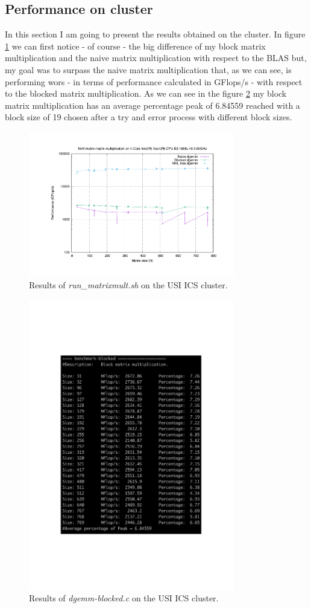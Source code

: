 \documentclass[unicode,11pt,a4paper,oneside,numbers=endperiod,openany]{scrartcl}
\begin{document}
\subsection{Performance on cluster}
In this section I am going to present the results obtained on the cluster. In figure \ref{fig:clustyPerfGraph} we can first notice - of course - the big difference of my block matrix multiplication and the naive matrix multiplication with respect to the BLAS but, my goal was to surpass the naive matrix multiplication that, as we can see, is performing wors - in terms of performance calculated in GFlops/s - with respect to the blocked matrix multiplication. As we can see in the figure  \ref{fig:clustyPerf} my block matrix multiplication has an average percentage peak of 6.84559 reached with a block size of 19 chosen after a try and error process with different block sizes.
\begin{figure}[h!]
	\centering
	\includegraphics[width=0.8\textwidth]{Figures/timing.pdf}
	\caption{Results of \textit{run\_matrixmult.sh} on the USI ICS cluster.}
	\label{fig:clustyPerfGraph}
\end{figure}

\begin{figure}[h!]
	\centering
	\includegraphics[width=0.8\textwidth]{Figures/cluster_performance.pdf}
	\caption{Results of \textit{dgemm-blocked.c} on the USI ICS cluster.}
	\label{fig:clustyPerf}
\end{figure}
\end{document}
